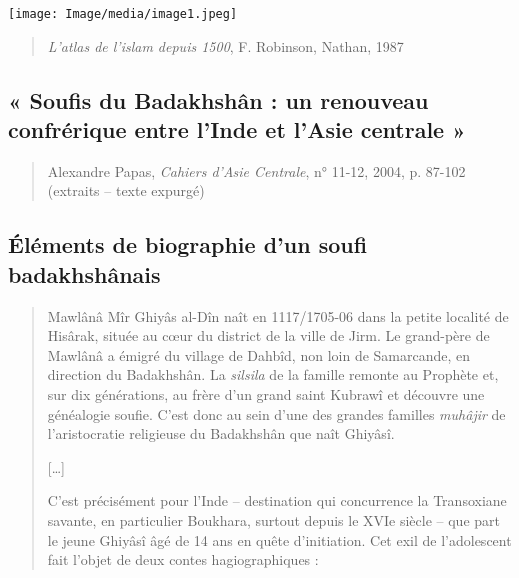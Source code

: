 \texttt{[image: Image/media/image1.jpeg]}

\begin{quote}
\emph{L'atlas de l'islam depuis 1500}, F. Robinson, Nathan, 1987
\end{quote}

\hypertarget{soufis-du-badakhshuxe2n-un-renouveau-confruxe9rique-entre-linde-et-lasie-centrale}{%
\subsection{« Soufis du Badakhshân : un renouveau confrérique entre
l'Inde et l'Asie centrale
»}\label{soufis-du-badakhshuxe2n-un-renouveau-confruxe9rique-entre-linde-et-lasie-centrale}}

\begin{quote}
Alexandre Papas, \emph{Cahiers d'Asie Centrale}, n° 11-12, 2004, p.
87-102 (extraits -- texte expurgé)
\end{quote}

\hypertarget{uxe9luxe9ments-de-biographie-dun-soufi-badakhshuxe2nais}{%
\subsection{Éléments de biographie d'un soufi
badakhshânais}\label{uxe9luxe9ments-de-biographie-dun-soufi-badakhshuxe2nais}}

\begin{quote}
Mawlânâ Mîr Ghiyâs al-Dîn naît en 1117/1705-06 dans la petite localité
de Hisârak, située au cœur du district de la ville de Jirm. Le
grand-père de Mawlânâ a émigré du village de Dahbîd, non loin de
Samarcande, en direction du Badakhshân. La \emph{silsila} de la famille
remonte au Prophète et, sur dix générations, au frère d'un grand saint
Kubrawî et découvre une généalogie soufie. C'est donc au sein d'une des
grandes familles \emph{muhâjir} de l'aristocratie religieuse du
Badakhshân que naît Ghiyâsî.

{[}\ldots{]}

C'est précisément pour l'Inde -- destination qui concurrence la
Transoxiane savante, en particulier Boukhara, surtout depuis le XVIe
siècle -- que part le jeune Ghiyâsî âgé de 14 ans en quête d'initiation.
Cet exil de l'adolescent fait l'objet de deux contes hagiographiques :
\end{quote}


